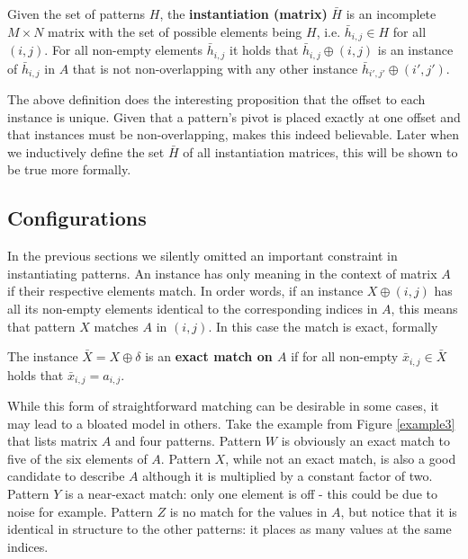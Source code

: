 \documentclass[a4paper,notoc,oneside]{tufte-book}
\begin{document}
\begin{definition}
Given the set of patterns $H$, the \textbf{instantiation (matrix)} $\bar{H}$ is an incomplete $M\times N$ matrix with the set of possible elements being $H$, i.e. $\bar{h}_{i,j} \in H$ for all $(i,j)$. For all non-empty elements $\bar{h}_{i,j}$ it holds that $\bar{h}_{i,j} \oplus (i,j)$ is an instance of $\bar{h}_{i,j}$ in $A$ that is not non-overlapping with any other instance $\bar{h}_{i',j'} \oplus (i',j')$.
\end{definition}

The above definition does the interesting proposition that the offset to each instance is unique. Given that a pattern's pivot is placed exactly at one offset and that instances must be non-overlapping, makes this indeed believable. Later when we inductively define the set $\bar{H}$ of all instantiation matrices, this will be shown to be true more formally. 


\subsection{Configurations}

In the previous sections we silently omitted an important constraint in instantiating patterns. An instance has only meaning in the context of matrix $A$ if their respective elements match. In order words, if an instance $X \oplus (i,j)$ has all its non-empty elements identical to the corresponding indices in $A$, this means that pattern $X$ matches $A$ in $(i,j)$. In this case the match is exact, formally
\begin{definition}
The instance $\bar{X}=X \oplus \delta$ is an \textbf{exact match on $A$} if for all non-empty $\bar{x}_{i,j} \in \bar{X}$ holds that $\bar{x}_{i,j} = a_{i,j}$.
\end{definition}

While this form of straightforward matching can be desirable in some cases, it may lead to a bloated model in others. Take the example from Figure \ref{example3} that lists matrix $A$ and four patterns. Pattern $W$ is obviously an exact match to five of the six elements of $A$. Pattern $X$, while not an exact match, is also a good candidate to describe $A$ although it is multiplied by a constant factor of two. Pattern $Y$ is a near-exact match: only one element is off - this could be due to noise for example. Pattern $Z$ is no match for the values in $A$, but notice that it is identical in structure to the other patterns: it places as many values at the same indices. 
\end{document}
